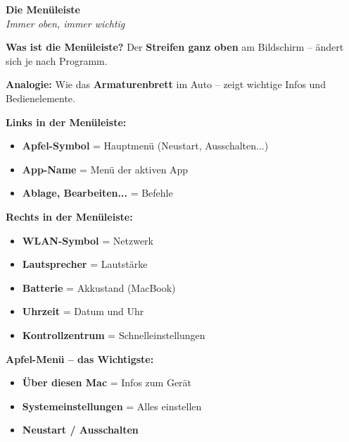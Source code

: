 \documentclass[a4paper,landscape,8pt]{extarticle}
\begin{document}
\hfill%
\begin{minipage}[t]{0.32\linewidth}
\begin{center}
\colorbox{menubar}{%
\begin{minipage}{0.95\linewidth}
\vspace{2mm}
\begin{center}
{\Large\bfseries\textcolor{macgray}{Die Menüleiste}}\\[1pt]
{\footnotesize\itshape Immer oben, immer wichtig}
\end{center}
\vspace{2mm}
\end{minipage}%
}
\end{center}

\vspace{1mm}

\textbf{Was ist die Menüleiste?} Der \textbf{Streifen ganz oben} am Bildschirm -- ändert sich je nach Programm.

\textbf{Analogie:} Wie das \textbf{Armaturenbrett} im Auto -- zeigt wichtige Infos und Bedienelemente.

\textbf{Links in der Menüleiste:}
\begin{itemize}
\item \textbf{Apfel-Symbol} = Hauptmenü (Neustart, Ausschalten...)
\item \textbf{App-Name} = Menü der aktiven App
\item \textbf{Ablage, Bearbeiten...} = Befehle
\end{itemize}

\textbf{Rechts in der Menüleiste:}
\begin{itemize}
\item \textbf{WLAN-Symbol} = Netzwerk
\item \textbf{Lautsprecher} = Lautstärke
\item \textbf{Batterie} = Akkustand (MacBook)
\item \textbf{Uhrzeit} = Datum und Uhr
\item \textbf{Kontrollzentrum} = Schnelleinstellungen
\end{itemize}

\textbf{Apfel-Menü -- das Wichtigste:}
\begin{itemize}
\item \textbf{Über diesen Mac} = Infos zum Gerät
\item \textbf{Systemeinstellungen} = Alles einstellen
\item \textbf{Neustart / Ausschalten}
\end{itemize}

\end{minipage}%
\end{document}
